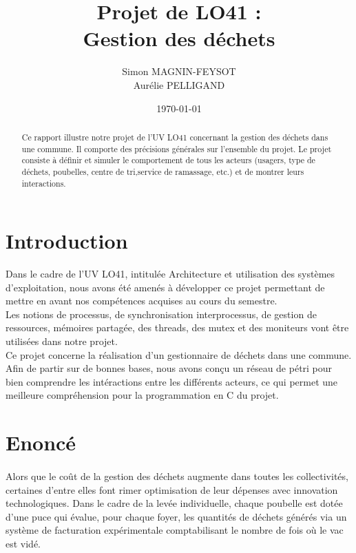 \documentclass[12pt]{article}
\title{\textbf{Projet de LO41 : \\Gestion des déchets}}
\author{Simon MAGNIN-FEYSOT\\
		Aurélie PELLIGAND}
\date{\today}
\begin{document}
\begin{titlepage}
\maketitle
\begin{abstract}Ce rapport illustre notre projet de l'UV LO41 concernant la gestion des déchets dans une commune. Il comporte des précisions générales sur l'ensemble du projet. Le projet consiste à définir et simuler le comportement de tous les acteurs (usagers, type de déchets, poubelles, centre de tri,service de ramassage, etc.) et de montrer leurs interactions.
\end{abstract}

\tableofcontents
\thispagestyle{empty}
\end{titlepage}

\section{Introduction}
\setcounter{page}{2}
Dans le cadre de l'UV LO41, intitulée Architecture et utilisation des systèmes d'exploitation, nous avons été amenés à développer ce projet permettant de mettre en avant nos compétences acquises au cours du semestre. \\

Les notions de processus, de synchronisation interprocessus, de gestion de ressources, mémoires partagée, des threads, des mutex et des moniteurs vont être utilisées dans notre projet.\\

Ce projet concerne la réalisation d'un gestionnaire de déchets dans une commune. Afin de partir sur de bonnes bases, nous avons conçu un réseau de pétri pour bien comprendre les intéractions entre les différents acteurs, ce qui permet une meilleure compréhension pour la programmation en C du projet.

\section{Enoncé}
\paragraph{}Alors que le coût de la gestion des déchets augmente dans toutes les collectivités, certaines d'entre elles font rimer optimisation de leur dépenses avec innovation technologiques. Dans le cadre de la levée individuelle, chaque poubelle est dotée d'une puce qui évalue, pour chaque foyer, les quantités de déchets générés via un système de facturation expérimentale comptabilisant le nombre de fois où le vac est vidé.\\
\end{document}
